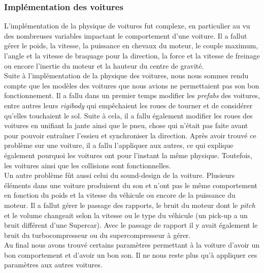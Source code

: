 \documentclass[12pt,a4paper]{article}
\begin{document}
            \subsubsection{Implémentation des voitures}
                L'implémentation de la physique de voitures fut complexe, en particulier au vu des 
                nombreuses variables impactant le comportement d'une voiture. Il a fallut gérer le 
                poids, la vitesse, la puissance en chevaux du moteur, le couple maximum, l'angle et la 
                vitesse de braquage pour la direction, la force et la vitesse de freinage ou encore 
                l'inertie du moteur et la hauteur du centre de gravité.\\
                Suite à l'implémentation de la physique des voitures, nous nous sommes rendu compte que 
                les modèles des voitures que nous avions ne permettaient pas son bon fonctionnement. Il 
                a fallu dans un premier temps modifier les \textit{prefabs} des voitures, entre autres 
                leurs \textit{rigibody} qui empêchaient les roues de tourner et de considérer qu'elles 
                touchaient le sol. Suite à cela, il a fallu également modifier les roues des voitures en
                unifiant la jante ainsi que le pneu, chose qui n'était pas faite avant pour pouvoir 
                entraîner l'essieu et synchroniser la direction. Après avoir trouvé ce problème sur une 
                voiture, il a fallu l'appliquer aux autres, ce qui explique également pourquoi les 
                voitures ont pour l'instant la même physique. Toutefois, les voitures ainsi que les 
                collisions sont fonctionnelles.\\
                Un autre problème fût aussi celui du sound-design de la voiture. Plusieurs éléments dans
                une voiture produisent du son et n'ont pas le même comportement en fonction du poids et
                la vitesse du véhicule ou encore de la puissance du moteur. Il a fallut gérer le passage
                des rapports, le bruit du moteur dont le \textit{pitch} et le volume changeait selon la
                vitesse ou le type du véhicule (un pick-up a un bruit différent d'une Supercar). Avec le
                passage de rapport il y avait également le bruit du turbocompresseur ou du
                supercompresseur à gérer.\\
                Au final nous avons trouvé certains paramètres permettant à la voiture d'avoir un bon
                comportement et d'avoir un bon son. Il ne nous reste plus qu'à appliquer ces paramètres
                aux autres voitures.
\end{document}

